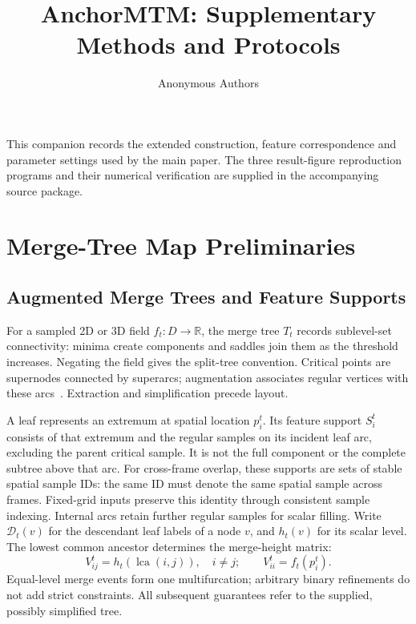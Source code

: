 \documentclass[review]{vgtc}
\title{AnchorMTM: Supplementary Methods and Protocols}
\author{Anonymous Authors}
\newcommand{\lca}{\operatorname{lca}}
\begin{document}
\maketitle
This companion records the extended construction, feature correspondence and parameter settings used by the main paper. The three result-figure reproduction programs and their numerical verification are supplied in the accompanying source package.
\section{Merge-Tree Map Preliminaries}\label{sec:background}
\subsection{Augmented Merge Trees and Feature Supports}
For a sampled 2D or 3D field $f_t:D\to\mathbb{R}$, the merge tree $T_t$ records sublevel-set connectivity: minima create components and saddles join them as the threshold increases. Negating the field gives the split-tree convention. Critical points are supernodes connected by superarcs; augmentation associates regular vertices with these arcs~\cite{Koepp:2023:TMTM,STMTM:2026,Tierny:2018:TTK}. Extraction and simplification precede layout.

A leaf represents an extremum at spatial location $p_i^t$. Its feature support $S_i^t$ consists of that extremum and the regular samples on its incident leaf arc, excluding the parent critical sample. It is not the full component or the complete subtree above that arc. For cross-frame overlap, these supports are sets of stable spatial sample IDs: the same ID must denote the same spatial sample across frames. Fixed-grid inputs preserve this identity through consistent sample indexing. Internal arcs retain further regular samples for scalar filling. Write $\mathcal{D}_t(v)$ for the descendant leaf labels of a node $v$, and $h_t(v)$ for its scalar level. The lowest common ancestor determines the merge-height matrix:
\begin{equation}\label{eq:merge}
 V_{ij}^t=h_t(\lca(i,j)),\quad i\ne j;\qquad
 V_{ii}^t=f_t(p_i^t).
\end{equation}
Equal-level merge events form one multifurcation; arbitrary binary refinements do not add strict constraints. All subsequent guarantees refer to the supplied, possibly simplified tree.
\end{document}
